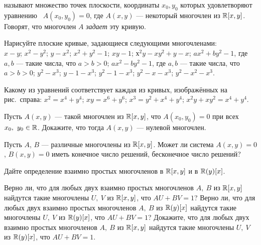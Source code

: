 \documentclass[a4paper,12pt]{article}
\begin{document}



\/ называют множество точек
плоскости, координаты $x_0,y_0$ которых удовлетворяют уравнению
\ $A(x_0,y_0)=0$,  где $A(x,y)$ --- некоторый
многочлен из $\mathbb{R}[x,y]$.
Говорят, что многочлен $A$ {\it задает}\/ эту кривую.

  Нарисуйте плоские кривые, задающиеся следующими многочленами:\\
 $x-y$;
 $x^2-y^2$;
 $y-x^2$;
 $x^2+y^2-1$;
 $xy-1$;
 $х^2y-xy^2+y-x$;
 $ax^2+by^2-1$, где $a,b$ --- такие числа, что $a>b>0$;
 $ax^2-by^2-1$, где $a,b$ --- такие числа, что $a>b>0$;
 $y^2-x^3$;\quad
{} $y-1-x^3$;\quad
{} $y^2-1-x^3$;\quad
{} $y^2-x-x^3$;\quad
{} $y^2-x^2-x^3$.

 Какому из уравнений соответствует каждая из
кривых, изо\-бра\-ж\"ен\-ных на рис.~справа:
 $x^2=x^4+y^4$;
 $xy=x^6+y^6$;
 $x^3=y^2+x^4+y^4$;
 $x^2y+xy^2=x^4+y^4$.





 Пусть $A(x,y)$ --- такой многочлен из $\mathbb{R}[x,y]$, что
$A(x_0,y_0)=0$ при всех $x_0,\ y_0\in\mathbb{R}$.
Докажите, что тогда $A(x,y)$ --- нулевой многочлен.

  Пусть $A$, $B$ --- различные многочлены из $\mathbb{R}[x,y]$.
Может ли система $A(x,y)=0$, $B(x,y)=0$ иметь
конечное число решений,  бесконечное число решений?

Дайте определение взаимно простых многочленов в $\mathbb{R}[x,y]$ и в $\mathbb{R}(y)[x]$.


 Верно ли, что для любых двух взаимно простых многочленов
$A,\ B$ из $\mathbb{R}[x,y]$ найдутся такие многочлены $U,\ V$
из $\mathbb{R}[x,y]$, что $AU+BV=1$?
 Верно ли, что для любых двух взаимно простых
многочленов $A,\ B$ из $\mathbb{R}(y)[x]$  найдутся такие  многочлены
$U,\ V$ из $\mathbb{R}(y)[x]$,  что $AU+BV=1$?
 Докажите, что для любых двух взаимно простых
многочленов $A,\ B$ из $\mathbb{R}[x,y]$  найдутся такие  многочлены
$U,\ V$ из $\mathbb{R}(y)[x]$,  что $AU+BV=1$.
\end{document}
